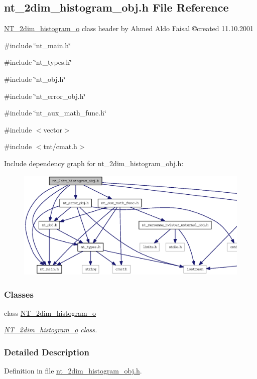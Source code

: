 \subsection{nt\_\-2dim\_\-histogram\_\-obj.h File Reference}
\label{nt__2dim__histogram__obj_8h}



\begin{DoxyItemize}
\item \hyperlink{class_n_t__2dim__histogram__o}{NT\_\-2dim\_\-histogram\_\-o} class header by Ahmed Aldo Faisal \copyright created 11.10.2001 
\end{DoxyItemize} 


{\ttfamily \#include \char`\"{}nt\_\-main.h\char`\"{}}\par
{\ttfamily \#include \char`\"{}nt\_\-types.h\char`\"{}}\par
{\ttfamily \#include \char`\"{}nt\_\-obj.h\char`\"{}}\par
{\ttfamily \#include \char`\"{}nt\_\-error\_\-obj.h\char`\"{}}\par
{\ttfamily \#include \char`\"{}nt\_\-aux\_\-math\_\-func.h\char`\"{}}\par
{\ttfamily \#include $<$vector$>$}\par
{\ttfamily \#include $<$tnt/cmat.h$>$}\par
Include dependency graph for nt\_\-2dim\_\-histogram\_\-obj.h:
\nopagebreak
\begin{figure}[H]
\begin{center}
\leavevmode
\includegraphics[width=400pt]{nt__2dim__histogram__obj_8h__incl}
\end{center}
\end{figure}
\subsubsection*{Classes}
\begin{DoxyCompactItemize}
\item 
class \hyperlink{class_n_t__2dim__histogram__o}{NT\_\-2dim\_\-histogram\_\-o}
\begin{DoxyCompactList}\small\item\em \hyperlink{class_n_t__2dim__histogram__o}{NT\_\-2dim\_\-histogram\_\-o} class. \item\end{DoxyCompactList}\end{DoxyCompactItemize}


\subsubsection{Detailed Description}


Definition in file \hyperlink{nt__2dim__histogram__obj_8h_source}{nt\_\-2dim\_\-histogram\_\-obj.h}.

